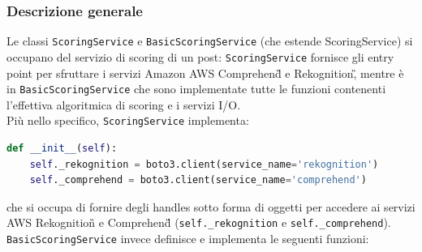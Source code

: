 \subsubsection{Descrizione generale}
Le classi \verb+ScoringService+ e \verb+BasicScoringService+ (che estende ScoringService\verb++) si occupano
del servizio di scoring di un post: \verb+ScoringService+ fornisce gli entry point per sfruttare 
i servizi Amazon AWS Comprehend\G{} e Rekognition\G, mentre è in \verb+BasicScoringService+ che sono 
implementate tutte le funzioni contenenti l'effettiva algoritmica di scoring e i servizi I/O.\\
Più nello specifico, \verb+ScoringService+ implementa:
\begin{lstlisting}[language=Python]
def __init__(self):
    self._rekognition = boto3.client(service_name='rekognition')
    self._comprehend = boto3.client(service_name='comprehend')
\end{lstlisting}
che si occupa di fornire degli handles sotto forma di oggetti per accedere ai servizi AWS Rekognition\G{}
e Comprehend\G{} (\verb+self._rekognition+ e \verb+self._comprehend+).\\
\verb+BasicScoringService+ invece definisce e implementa le seguenti funzioni:

